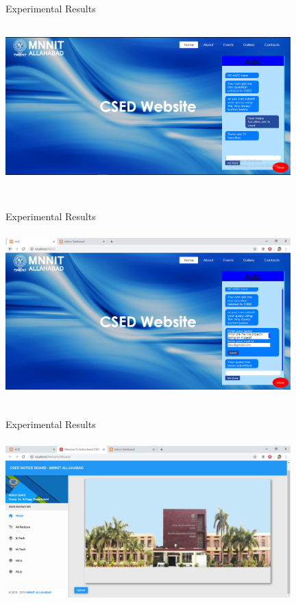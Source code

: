 \documentclass{beamer}
\begin{document}
\begin{frame}{Experimental Results}
   \includegraphics[width=11cm, height=7cm]{s2.PNG}
   
\end{frame}\begin{frame}{Experimental Results}
   \includegraphics[width=11cm, height=7cm]{s3.png}
   
\end{frame}\begin{frame}{Experimental Results}
   \includegraphics[width=11cm, height=7cm]{s4.png}
   
\end{frame}
\end{document}
